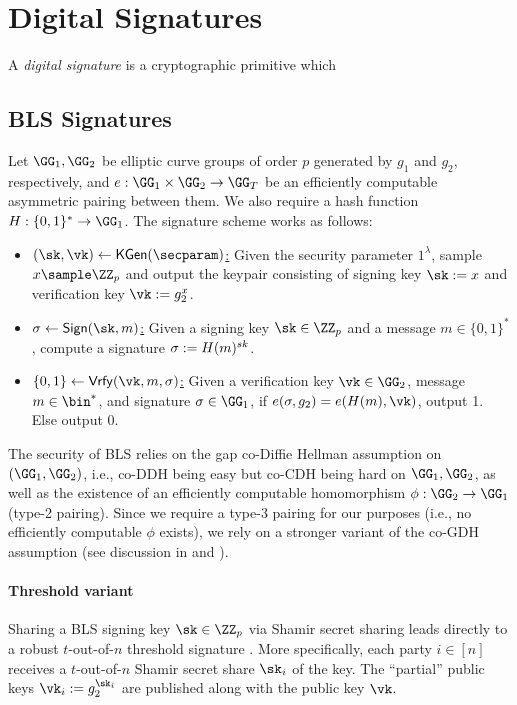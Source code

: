 \section{Digital Signatures}\label{sec:signatures}

A \emph{digital signature} is a cryptographic primitive which 

\subsection{BLS Signatures}\label{sec:bls}

\begin{construction}\label{con:bls}
Let $\GG_1, \GG_2$ be elliptic curve groups of order $p$ generated by $g_1$ and $g_2$, respectively, and $e: \GG_1 \times \GG_2 \rightarrow \GG_T$ be an efficiently computable asymmetric pairing between them. We also require a hash function $\blshash: \{0, 1\}^* \rightarrow \GG_1$. The signature scheme works as follows:
\begin{itemize}
\item \underline{$(\sk, \vk) \gets \kgen(\secparam)$:} Given the security parameter $1^\lambda$, sample $x \sample \ZZ_p$ and output the keypair consisting of signing key $\sk := x$ and verification key $\vk := g_2^x$.
\item \underline{$\sigma \gets \sign(\sk, m)$:} Given a signing key $\sk \in \ZZ_p$ and a message $m \in \{0,1\}^*$, compute a signature $\sigma := H(m)^{sk}$.
\item \underline{$\{0,1\} \gets \vrfy(\vk, m, \sigma)$:} Given a verification key $\vk \in \GG_2$, message $m \in \bin^*$, and signature $\sigma \in \GG_1$, if $e(\sigma, g_2) = e(\blshash(m), \vk)$, output 1. Else output 0.
\end{itemize}
\end{construction}

The security of BLS relies on the gap co-Diffie Hellman assumption on $(\GG_1,\GG_2)$, i.e., co-DDH being easy but co-CDH being hard on $\GG_1,\GG_2$, as well as the existence of an efficiently computable homomorphism $\phi: \GG_2 \rightarrow \GG_1$ (type-2 pairing). Since we require a type-3 pairing for our purposes (i.e., no efficiently computable $\phi$ exists), we rely on a stronger variant of the co-GDH assumption (see discussion in \cite[\S3.1]{AC:BonLynSha01} and \cite[\S2.2]{EPRINT:SmaVer05}).

\paragraph{Threshold variant}
Sharing a BLS signing key $\sk \in \ZZ_p$ via Shamir secret sharing leads directly to a robust $t$-out-of-$n$ threshold signature \cite{AC:BonLynSha01}.
More specifically, each party $i \in [n]$ receives a $t$-out-of-$n$ Shamir secret share $\sk_i$ of the key. The ``partial'' public keys $\vk_i := g_2^{\sk_i}$ are published along with the public key $\vk$.

